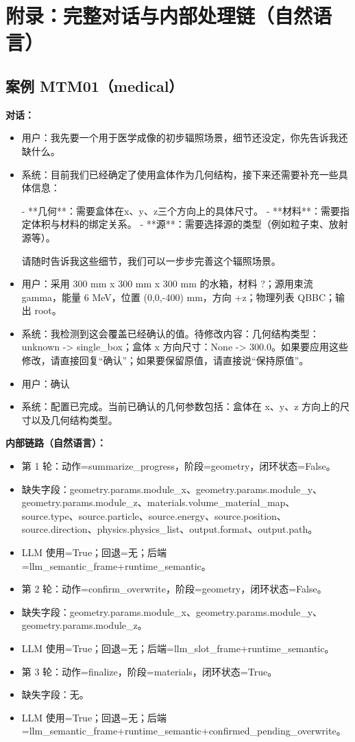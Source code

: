 \documentclass[11pt]{ctexart}
\begin{document}
\section{附录：完整对话与内部处理链（自然语言）}
\subsection{案例 MTM01（medical）}
\textbf{对话：}
\begin{itemize}
\item 用户：我先要一个用于医学成像的初步辐照场景，细节还没定，你先告诉我还缺什么。
\item 系统：目前我们已经确定了使用盒体作为几何结构，接下来还需要补充一些具体信息：

- **几何**：需要盒体在x、y、z三个方向上的具体尺寸。
- **材料**：需要指定体积与材料的绑定关系。
- **源**：需要选择源的类型（例如粒子束、放射源等）。

请随时告诉我这些细节，我们可以一步步完善这个辐照场景。
\item 用户：采用 300 mm x 300 mm x 300 mm 的水箱，材料 ?；源用束流 gamma，能量 6 MeV，位置 (0,0,-400) mm，方向 +z；物理列表 QBBC；输出 root。
\item 系统：我检测到这会覆盖已经确认的值。待修改内容：几何结构类型：unknown -> single\_box；盒体 x 方向尺寸：None -> 300.0。如果要应用这些修改，请直接回复“确认”；如果要保留原值，请直接说“保持原值”。
\item 用户：确认
\item 系统：配置已完成。当前已确认的几何参数包括：盒体在 x、y、z 方向上的尺寸以及几何结构类型。
\end{itemize}
\textbf{内部链路（自然语言）：}
\begin{itemize}
\item 第 1 轮：动作=summarize\_progress，阶段=geometry，闭环状态=False。
\item 缺失字段：geometry.params.module\_x、geometry.params.module\_y、geometry.params.module\_z、materials.volume\_material\_map、source.type、source.particle、source.energy、source.position、source.direction、physics.physics\_list、output.format、output.path。
\item LLM 使用=True；回退=无；后端=llm\_semantic\_frame+runtime\_semantic。
\item 第 2 轮：动作=confirm\_overwrite，阶段=geometry，闭环状态=False。
\item 缺失字段：geometry.params.module\_x、geometry.params.module\_y、geometry.params.module\_z。
\item LLM 使用=True；回退=无；后端=llm\_slot\_frame+runtime\_semantic。
\item 第 3 轮：动作=finalize，阶段=materials，闭环状态=True。
\item 缺失字段：无。
\item LLM 使用=True；回退=无；后端=llm\_semantic\_frame+runtime\_semantic+confirmed\_pending\_overwrite。
\end{itemize}
\end{document}
